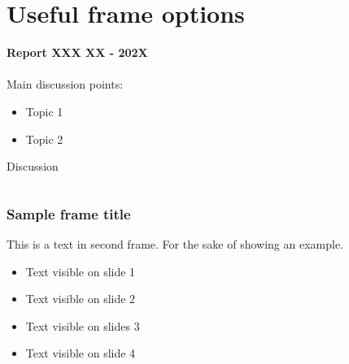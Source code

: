 \documentclass[8pt]{beamer}
\begin{document}
	\section*{Useful frame options}
	\label{}
	\justifying
	\begin{frame}
		\textbf{Report XXX XX - 202X}\\~\\
		Main discussion points:
		\begin{itemize}
			\item Topic 1
			\item Topic 2
		\end{itemize}
	\end{frame}

	\begin{frame}{Discussion}
		\begin{columns}
			
			
			
			
		\end{columns}
	\end{frame}
	\begin{frame}
	\end{frame}
	\begin{frame}
	\end{frame}
	\begin{frame}
	\end{frame}
	\begin{frame}
		\frametitle{Sample frame title}
		This is a text in second frame. For the sake of showing an example.
		
		\begin{itemize}
			\item<1-> Text visible on slide 1
			\item<2-> Text visible on slide 2
			\item<3> Text visible on slides 3
			\item<4-> Text visible on slide 4
		\end{itemize}
	\end{frame}
	
\end{document}
